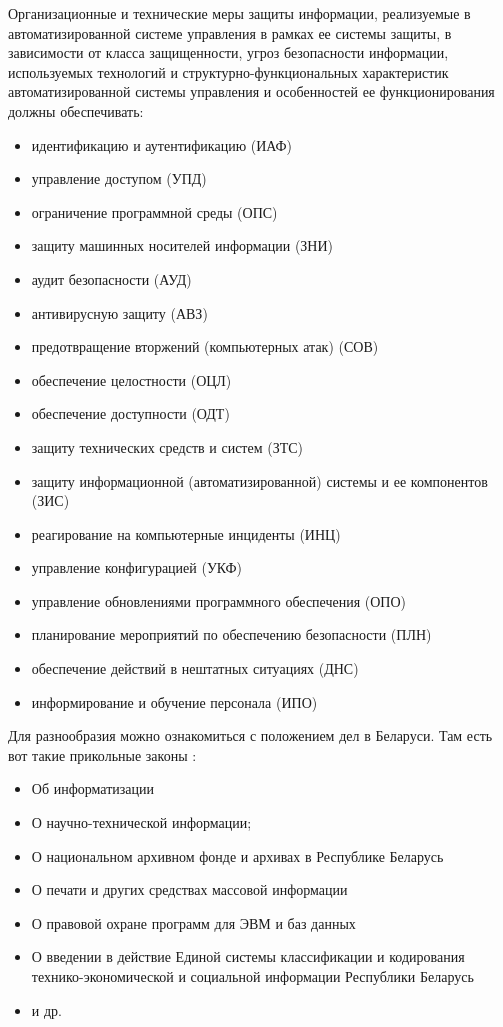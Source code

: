 \begin{grayquote}
	Организационные и технические меры защиты информации, реализуемые в автоматизированной системе управления в рамках ее системы защиты, в зависимости от класса защищенности, угроз безопасности информации, используемых технологий и структурно-функциональных характеристик автоматизированной системы управления и особенностей ее функционирования должны обеспечивать:
	\begin{itemize}
		\item идентификацию и аутентификацию (ИАФ)
		\item управление доступом (УПД)
		\item ограничение программной среды (ОПС)
		\item защиту машинных носителей информации (ЗНИ)
		\item аудит безопасности (АУД)
		\item антивирусную защиту (АВЗ)
		\item предотвращение вторжений (компьютерных атак) (СОВ)
		\item обеспечение целостности (ОЦЛ)
		\item обеспечение доступности (ОДТ)
		\item защиту технических средств и систем (ЗТС)
		\item защиту информационной (автоматизированной) системы и ее компонентов (ЗИС)
		\item реагирование на компьютерные инциденты (ИНЦ)
		\item управление конфигурацией (УКФ)
		\item управление обновлениями программного обеспечения (ОПО)
		\item планирование мероприятий по обеспечению безопасности (ПЛН)
		\item обеспечение действий в нештатных ситуациях (ДНС)
		\item информирование и обучение персонала (ИПО)
	\end{itemize}
\end{grayquote}

Для разнообразия можно ознакомиться с положением дел в Беларуси. Там есть вот такие прикольные законы \autocite{BSEU}:
\begin{itemize}
	\item Об информатизации
	\item О научно-технической информации;
	\item О национальном архивном фонде и архивах в Республике Беларусь
	\item О печати и других средствах массовой информации
	\item О правовой охране программ для ЭВМ и баз данных
	\item О введении в действие Единой системы классификации и кодирования технико-экономической и социальной информации Республики Беларусь
	\item и др.
\end{itemize}

